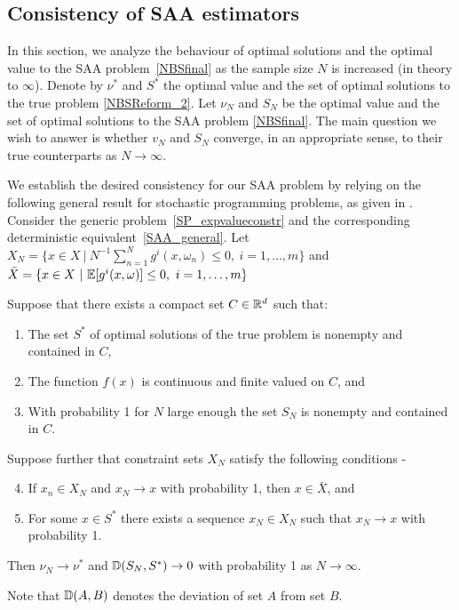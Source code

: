 \subsection{Consistency of SAA estimators} \label{S:SAAcons}

In this section, we analyze the behaviour of optimal solutions and the optimal
value to the SAA problem~\eqref{NBSfinal} as the sample size $N$ is increased
(in theory to $\infty$). Denote by $\nu^*$ and $S^*$ the optimal value and the
set of optimal solutions to the true problem \eqref{NBSReform_2}. Let
$\nu_N$ and $S_N$ be the optimal value and the set of optimal solutions to the
SAA problem \eqref{NBSfinal}. The main question we wish to answer is whether
$v_N$ and $S_N$ converge, in an appropriate sense, to their true counterparts as
$N \to \infty$. 

We establish the desired consistency for our SAA problem by
relying on the following general result for stochastic
programming problems, as given in \cite{shapiro_lectures_2009}. Consider the
generic problem~\eqref{SP_expvalueconstr} and the corresponding deterministic
equivalent~\eqref{SAA_general}. Let $X_N = \{ x \in X \ | \
N^{-1} \sum_{n=1}^N g^i(x, \omega_n) \leq 0, \ i=1,\ldots,m \}$ and $\bar{X} =
\{ x \in X \ | \ \mathbb{E} [ g^i(x, \omega)] \leq 0, \ i=1,\ldots,m \}$

\begin{theorem} \label{SAAcons} \citep{shapiro_lectures_2009}
	Suppose that there exists a compact set $C \in \mathbb R^d$ such that: 
	\begin{enumerate}[label=(\roman*)]
		\item{The set $S^*$ of optimal solutions of the true problem is nonempty and
			contained in $C$,}
		\item{The function $f(x)$ is continuous and finite valued on $C$, and}
		\item{With probability 1 for $N$ large enough the set $S_N$ is nonempty
			and contained in $C$.} 
	\end{enumerate}
	Suppose further that constraint sets $X_N$ satisfy the following conditions
	- 
	\begin{enumerate}[label=(\roman*)]
		\setcounter{enumi}{3}
		\item{If $x_n \in X_N$ and $x_N \to x$ with probability 1, then $x \in \bar{X}$, and}
		\item{For some $x \in S^*$ there exists a sequence $x_N \in X_N$ such that $x_N
			\to x$ with probability 1.} 
	\end{enumerate}
	Then $\nu_N \to \nu^*$ and $\mathbb{D}(S_N, S^*) \to 0$ with probability 1 as $N \to
	\infty$. 
\end{theorem}
Note that $\mathbb{D}(A,B)$ denotes the deviation of set $A$ from set $B$.

